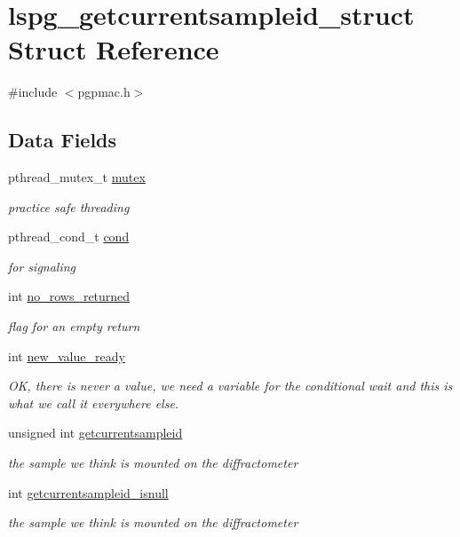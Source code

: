 \hypertarget{structlspg__getcurrentsampleid__struct}{\section{lspg\-\_\-getcurrentsampleid\-\_\-struct Struct Reference}
\label{structlspg__getcurrentsampleid__struct}
}


{\ttfamily \#include $<$pgpmac.\-h$>$}

\subsection*{Data Fields}
\begin{DoxyCompactItemize}
\item 
pthread\-\_\-mutex\-\_\-t \hyperlink{structlspg__getcurrentsampleid__struct_ace54acbdcbce620437962858ba04e256}{mutex}
\begin{DoxyCompactList}\small\item\em practice safe threading \end{DoxyCompactList}\item 
pthread\-\_\-cond\-\_\-t \hyperlink{structlspg__getcurrentsampleid__struct_a289960e45fdc9339a05dc8607f1b7563}{cond}
\begin{DoxyCompactList}\small\item\em for signaling \end{DoxyCompactList}\item 
int \hyperlink{structlspg__getcurrentsampleid__struct_a06758730db55730eb10d2d63e2520d71}{no\-\_\-rows\-\_\-returned}
\begin{DoxyCompactList}\small\item\em flag for an empty return \end{DoxyCompactList}\item 
int \hyperlink{structlspg__getcurrentsampleid__struct_ada3840f03195ee1807150f1e75fd3775}{new\-\_\-value\-\_\-ready}
\begin{DoxyCompactList}\small\item\em O\-K, there is never a value, we need a variable for the conditional wait and this is what we call it everywhere else. \end{DoxyCompactList}\item 
unsigned int \hyperlink{structlspg__getcurrentsampleid__struct_af629de1e076fd6763bccea3547ef24e7}{getcurrentsampleid}
\begin{DoxyCompactList}\small\item\em the sample we think is mounted on the diffractometer \end{DoxyCompactList}\item 
int \hyperlink{structlspg__getcurrentsampleid__struct_af370f8d1aaec7dd15121dc65d2a6cfc1}{getcurrentsampleid\-\_\-isnull}
\begin{DoxyCompactList}\small\item\em the sample we think is mounted on the diffractometer \end{DoxyCompactList}\end{DoxyCompactItemize}


